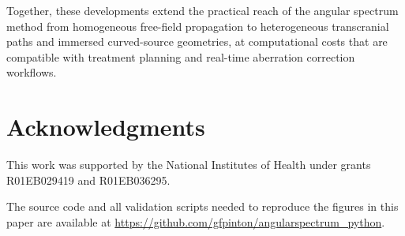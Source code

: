 \documentclass[11pt]{article}
\begin{document}
Together, these developments extend the practical reach of the angular
spectrum method from homogeneous free-field propagation to
heterogeneous transcranial paths and immersed curved-source
geometries, at computational costs that are compatible with treatment
planning and real-time aberration correction workflows.

\section*{Acknowledgments}

This work was supported by the National Institutes of Health under
grants R01EB029419 and R01EB036295.

The source code and all validation scripts needed to reproduce the
figures in this paper are available at
\url{https://github.com/gfpinton/angularspectrum_python}.
\end{document}
